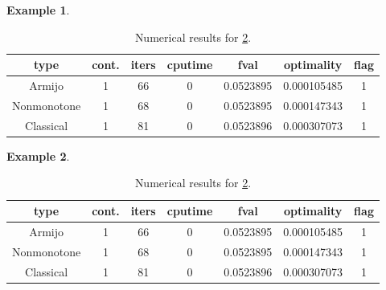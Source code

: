 \documentclass[a4paper]{article}
\newtheorem{example}{Example}
\newcommand{\mr}{\mathbb{R}}
\newcommand{\co}[1]{{\con{#1}}}
\begin{document}
\begin{example}\label{exp5}
\end{example}

\begin{table}[p]
  \centering
  \begin{tabular}{cc|ccccc}
    \hline
    type & cont. & iters & cputime & 
    fval & optimality & flag \\ \hline
    Armijo & 1 & 66 & 0 & 0.0523895 & 0.000105485 & 1 \\
    Nonmonotone & 1 & 68 & 0 & 0.0523895 & 0.000147343 & 1 \\
    Classical & 1 & 81 & 0 & 0.0523896 & 0.000307073 & 1 \\
    \hline
  \end{tabular}
  \caption{Numerical results for \cref{exp5}.}
  \label{tab5}
\end{table}
  
  
  \begin{example}\label{exp5}
  \end{example}
  
  \begin{table}[p]
    \centering
    \begin{tabular}{cc|ccccc}
      \hline
      type & cont. & iters & cputime & 
      fval & optimality & flag \\ \hline
      Armijo & 1 & 66 & 0 & 0.0523895 & 0.000105485 & 1 \\
      Nonmonotone & 1 & 68 & 0 & 0.0523895 & 0.000147343 & 1 \\
      Classical & 1 & 81 & 0 & 0.0523896 & 0.000307073 & 1 \\
      \hline
    \end{tabular}
    \caption{Numerical results for \cref{exp5}.}
    \label{tab5}
  \end{table}
  
\end{document}
